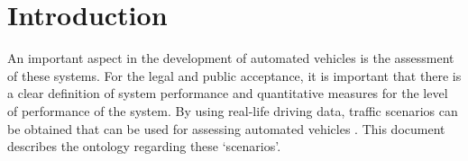 \section{Introduction}
\label{sec:introduction}

An important aspect in the development of automated vehicles is the assessment of these systems. For the legal and public acceptance, it is important that there is a clear definition of system performance and quantitative measures for the level of performance of the system. By using real-life driving data, traffic scenarios can be obtained that can be used for assessing automated vehicles \cite{stellet2015taxonomy}. This document describes the ontology regarding these `scenarios'.

